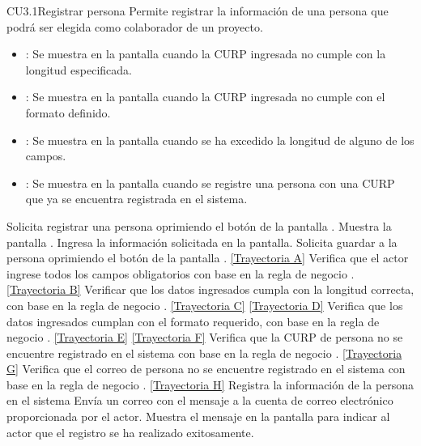 \begin{UseCase}{CU3.1}{Registrar persona}{
	Permite registrar la información de una persona que podrá ser elegida como colaborador de un proyecto.
	}
{\begin{itemize}
		\item {}: Se muestra en la pantalla  cuando la CURP ingresada no cumple con la longitud especificada.
		\item {}: Se muestra en la pantalla  cuando la CURP ingresada no cumple con el formato definido.
		\item {}: Se muestra en la pantalla  cuando se ha excedido la longitud de alguno de los campos.
		\item {}: Se muestra en la pantalla  cuando se registre una persona con una CURP que ya se encuentra registrada en el sistema.
		\end{itemize}
		}
	\end{UseCase}
	\begin{UCtrayectoria}
		\UCpaso[\UCactor] Solicita registrar una persona oprimiendo el botón  de la pantalla .
		\UCpaso[\UCsist] Muestra la pantalla .
		\UCpaso[\UCactor] Ingresa la información solicitada en la pantalla. \label{CU3.1-P3}
		\UCpaso[\UCactor] Solicita guardar a la persona oprimiendo el botón  de la pantalla . \hyperlink{CU3-1:TAA}{[Trayectoria A]}
		\UCpaso[\UCsist] Verifica que el actor ingrese todos los campos obligatorios con base en la regla de negocio . \hyperlink{CU3-1:TAB}{[Trayectoria B]}
		\UCpaso[\UCsist] Verificar que los datos ingresados cumpla con la longitud correcta, con base en la regla de negocio . \hyperlink{CU3-1:TAC}{[Trayectoria C]} \hyperlink{CU3-1:TAD}{[Trayectoria D]}
		\UCpaso[\UCsist] Verifica que los datos ingresados cumplan con el formato requerido, con base en la regla de negocio . \hyperlink{CU3-1:TAE}{[Trayectoria E]} \hyperlink{CU3-1:TAF}{[Trayectoria F]}
		\UCpaso[\UCsist] Verifica que la CURP de persona no se encuentre registrado en el sistema con base en la regla de negocio . \hyperlink{CU3-1:TAG}{[Trayectoria G]}
		\UCpaso[\UCsist] Verifica que el correo de persona no se encuentre registrado en el sistema con base en la regla de negocio . \hyperlink{CU3-1:TAH}{[Trayectoria H]}
		\UCpaso[\UCsist] Registra la información de la persona en el sistema
		\UCpaso[\UCsist] Envía un correo con el mensaje  a la cuenta de correo electrónico proporcionada por el actor.
		\UCpaso[\UCsist] Muestra el mensaje  en la pantalla  para indicar al actor que el registro se ha realizado exitosamente.
	\end{UCtrayectoria}		

